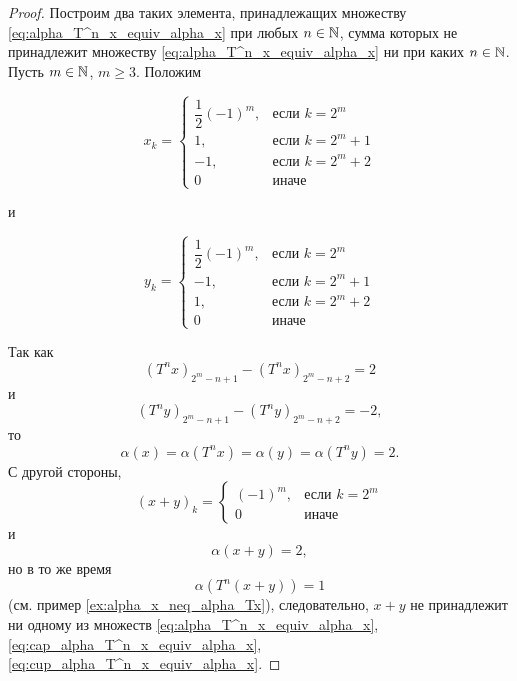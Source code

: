 \begin{proof}
	Построим два таких элемента, принадлежащих множеству \eqref{eq:alpha_T^n_x_equiv_alpha_x} при любых $n\in\mathbb{N}$,
	сумма которых не принадлежит множеству \eqref{eq:alpha_T^n_x_equiv_alpha_x} ни при каких $n\in\mathbb{N}$.
	Пусть $m\in\mathbb{N}$, $m \geq 3$.
	Положим

	\begin{equation}
		x_k = \begin{cases}
			\dfrac{1}{2}(-1)^m,  & \mbox{если } k = 2^m     \\
			1,                   & \mbox{если } k = 2^m + 1 \\
			-1,                  & \mbox{если } k = 2^m + 2 \\
			0                    & \mbox{иначе }
		\end{cases}
	\end{equation}

	и

	\begin{equation}
		y_k = \begin{cases}
			\dfrac{1}{2}(-1)^m,  & \mbox{если } k = 2^m     \\
			-1,                  & \mbox{если } k = 2^m + 1 \\
			1,                   & \mbox{если } k = 2^m + 2 \\
			0                    & \mbox{иначе }
		\end{cases}
	\end{equation}

	Так как
	\begin{equation}
		(T^n x)_{2^m-n+1} - (T^n x)_{2^m-n+2} = 2
	\end{equation}
	и
	\begin{equation}
		(T^n y)_{2^m-n+1} - (T^n y)_{2^m-n+2} = -2
		,
	\end{equation}
	то
	\begin{equation}
		\alpha(x) = \alpha(T^n x) = \alpha(y) = \alpha(T^n y) = 2
		.
	\end{equation}
	С другой стороны,
	\begin{equation}
		(x+y)_k = \begin{cases}
			(-1)^m,  & \mbox{если } k = 2^m     \\
			0        & \mbox{иначе }
		\end{cases}
	\end{equation}
	и
	\begin{equation}
		\alpha(x+y) = 2
		,
	\end{equation}
	но в то же время
	\begin{equation}
		\alpha(T^n(x+y)) = 1
	\end{equation}
	(см. пример \ref{ex:alpha_x_neq_alpha_Tx}),
	следовательно, $x+y$ не принадлежит ни одному из множеств
	\eqref{eq:alpha_T^n_x_equiv_alpha_x}, \eqref{eq:cap_alpha_T^n_x_equiv_alpha_x}, \eqref{eq:cup_alpha_T^n_x_equiv_alpha_x}.
\end{proof}




